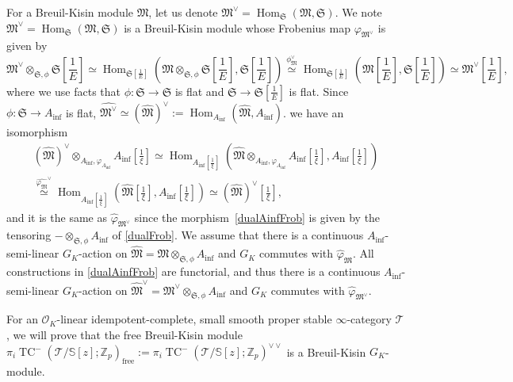 \documentclass[11pt]{amsart}
\newcommand{\Z}{\mathbb{Z}}
\newcommand{\sO}{\mathcal{O}}
\newcommand{\sT}{\mathcal{T}}
\newcommand{\bS}{\mathbb{S}}
\newcommand{\fM}{\mathfrak{M}}
\newcommand{\free}{\operatorname{{free}}}
\newcommand{\TCn}{\operatorname{TC}^{-}}
\newcommand{\Hom}{\operatorname{Hom}}
\newcommand{\Ainf}{A_{\operatorname{inf}}}
\newcommand{\mS}{\mathfrak{S}}
\theoremstyle{definition}
\theoremstyle{remark}
\numberwithin{equation}{section}
\begin{document}
For a Breuil-Kisin module $\fM$, let us denote $\fM^{\vee}=\Hom_{\mS}(\fM,\mS)$. We note $\fM^{\vee}=\Hom_{\mS}(\fM,\mS)$ is a Breuil-Kisin module whose Frobenius map $\varphi_{\fM^{\vee}}$ is given by 
\begin{equation}\label{dualFrob}
  \fM^\vee \otimes_{\mS,\phi} \mS[\frac{1}{E}] \simeq \Hom_{\mS[\frac{1}{E}]}(\fM\otimes_{\mS,\phi} \mS[\frac{1}{E}],\mS[\frac{1}{E}]) \overset{\phi_{\fM}^\vee}{\simeq} \Hom_{\mS[\frac{1}{E}]}(\fM[\frac{1}{E}],\mS[\frac{1}{E}]) \simeq \fM^\vee[\frac{1}{E}],
\end{equation}
where we use facts that $\phi:\mS\to\mS$ is flat and $\mS\to \mS[\frac{1}{E}]$ is flat. Since $\phi:\mS\to \Ainf$ is flat, $\widehat{\fM^{\vee}} \simeq (\widehat{\fM})^{\vee}:= \Hom_{\Ainf}(\widehat{\fM},\Ainf)$. we have an isomorphism
\begin{eqnarray}\label{dualAinfFrob}
(\widehat{\fM})^{\vee}\otimes_{\Ainf,\varphi_{\Ainf}}\Ainf[\frac{1}{\xi}]\simeq \Hom_{\Ainf[\frac{1}{\xi}]}(\widehat{\fM}\otimes_{\Ainf,\varphi_{\Ainf}}\Ainf[\frac{1}{\xi}], \Ainf[\frac{1}{\xi}])\\
\overset{\widehat{\varphi_{{\fM}}}^{\vee}}{\simeq} \Hom_{\Ainf[\frac{1}{\xi}]}(\widehat{\fM}[\frac{1}{\xi}], \Ainf[\frac{1}{\xi}]) \simeq (\widehat{\fM})^{\vee}[\frac{1}{\xi}], \nonumber
\end{eqnarray}
and it is the same as $\widehat{\varphi}_{\fM^\vee}$ since the morphism~\eqref{dualAinfFrob} is given by the tensoring $-\otimes_{\mS,\phi}\Ainf$ of \eqref{dualFrob}. We assume that there is a continuous $\Ainf$-semi-linear $G_K$-action on $\widehat{\fM}=\fM\otimes_{\mS,\phi}\Ainf$ and $G_K$ commutes with $\widehat{\varphi}_\fM$. All constructions in \eqref{dualAinfFrob} are functorial, and thus there is a continuous $\Ainf$-semi-linear $G_K$-action on $\widehat{\fM}^{\vee}=\fM^{\vee}\otimes_{\mS,\phi}\Ainf$ and $G_K$ commutes with $\widehat{\varphi}_{\fM^\vee}$.

For an $\sO_K$-linear idempotent-complete, small smooth proper stable $\infty$-category $\sT$, we will prove that the free Breuil-Kisin module $\pi_i \TCn(\sT/\bS[z];\Z_p)_{\free}:=\pi_i \TCn(\sT/\bS[z];\Z_p)^{\vee\vee}$ is a Breuil-Kisin $G_K$-module. 
\end{document}
